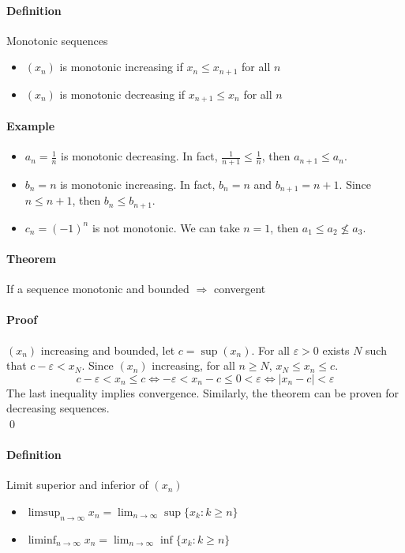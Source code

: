 \documentclass{article}
\newcommand{\abs}[1]{\left|#1\right|}
\newcommand{\limn}{\lim_{n \to \infty}}
\newcommand{\Ep}{\varepsilon}
\newcommand{\Def}{\paragraph{Definition}}
\newcommand{\Theorem}{\paragraph{Theorem}}
\newcommand{\Proof}{\paragraph{Proof}}
\newcommand{\Example}{\paragraph{Example}}
\begin{document}
	\Def Monotonic sequences
	\begin{itemize}
		\item $(x_n)$ is monotonic increasing if $x_n \leq x_{n+1}$ for all $n$
		\item $(x_n)$ is monotonic decreasing if $x_{n+1} \leq x_n$ for all $n$
	\end{itemize}

	\Example
	\begin{itemize}
		\item $a_n = \frac{1}{n}$ is monotonic decreasing. In fact, $\frac{1}{n+1}
		\leq \frac{1}{n}$, then $a_{n+1} \leq a_n$.
		\item $b_n = n$ is monotonic increasing. In fact, $b_n = n$ and $b_{n+1} =
		n + 1$. Since $n \leq n + 1$, then $b_n \leq b_{n+1}$.
		\item $c_n = (-1)^n$ is not monotonic. We can take $n = 1$, then $a_1 \leq
		a_2 \nleq a_3$.
	\end{itemize}

	\Theorem If a sequence monotonic and bounded $\Rightarrow$ convergent

	\Proof $(x_n)$ increasing and bounded, let $c = \sup(x_n)$. For all $\Ep
	> 0$ exists $N$ such that $c - \Ep < x_N$. Since $(x_n)$ increasing, for
	all $n \geq N$, $x_N \leq x_n \leq c$.
	\begin{equation*}
		c - \Ep < x_n \leq c \iff -\Ep < x_n - c \leq 0 < \Ep \iff
		\abs{x_n - c} < \Ep
	\end{equation*}
	The last inequality implies convergence. Similarly, the theorem can be proven
	for decreasing sequences.
\\\qed

	\Def Limit superior and inferior of $(x_n)$
	\begin{itemize}
		\item $\limsup_{n \to \infty} x_n = \limn \sup\{x_k : k \geq n\}$
		\item $\liminf_{n \to \infty} x_n = \limn \inf\{x_k : k \geq n\}$
	\end{itemize}
\end{document}
